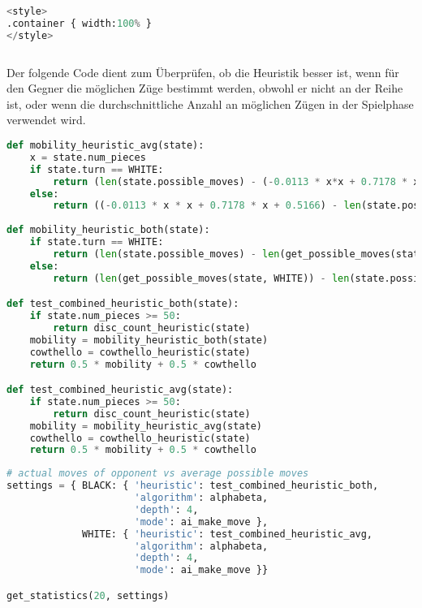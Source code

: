 \begin{lstlisting}[language=Python]
%%HTML
<style>
.container { width:100% }
</style>
\end{lstlisting}

\begin{lstlisting}[language=Python]
%run othello_test_util.ipynb
\end{lstlisting}

Der folgende Code dient zum Überprüfen, ob die Heuristik besser ist,
wenn für den Gegner die möglichen Züge bestimmt werden, obwohl er nicht
an der Reihe ist, oder wenn die durchschnittliche Anzahl an möglichen
Zügen in der Spielphase verwendet wird.

\begin{lstlisting}[language=Python]
def mobility_heuristic_avg(state):
    x = state.num_pieces
    if state.turn == WHITE:
        return (len(state.possible_moves) - (-0.0113 * x*x + 0.7178 * x + 0.5166)) / 64
    else:
        return ((-0.0113 * x * x + 0.7178 * x + 0.5166) - len(state.possible_moves)) / 64
    
def mobility_heuristic_both(state):
    if state.turn == WHITE:
        return (len(state.possible_moves) - len(get_possible_moves(state, BLACK))) / 64
    else:
        return (len(get_possible_moves(state, WHITE)) - len(state.possible_moves)) / 64

def test_combined_heuristic_both(state):
    if state.num_pieces >= 50:
        return disc_count_heuristic(state)
    mobility = mobility_heuristic_both(state)
    cowthello = cowthello_heuristic(state)
    return 0.5 * mobility + 0.5 * cowthello

def test_combined_heuristic_avg(state):
    if state.num_pieces >= 50:
        return disc_count_heuristic(state)
    mobility = mobility_heuristic_avg(state)
    cowthello = cowthello_heuristic(state)
    return 0.5 * mobility + 0.5 * cowthello
\end{lstlisting}

\begin{lstlisting}[language=Python]
# actual moves of opponent vs average possible moves
settings = { BLACK: { 'heuristic': test_combined_heuristic_both,
                      'algorithm': alphabeta,
                      'depth': 4,
                      'mode': ai_make_move },
             WHITE: { 'heuristic': test_combined_heuristic_avg,
                      'algorithm': alphabeta,
                      'depth': 4,
                      'mode': ai_make_move }}

get_statistics(20, settings)
\end{lstlisting}

